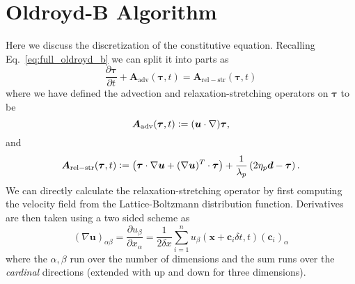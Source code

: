 \section{Oldroyd-B Algorithm}
Here we discuss the discretization of the constitutive equation. Recalling Eq.~\eqref{eq:full_oldroyd_b} we can split it into parts as
\begin{equation}\label{eq:oldroyd_b_operators}
\frac{\partial \bm{\tau}}{\partial t} + \bm{A}_{\mathrm{adv}}(\bm{\tau},t) =\bm{A}_{\mathrm{rel-str}}(\bm{\tau},t)
\end{equation}
where we have defined the advection and relaxation-stretching operators on $\bm{\tau}$ to be
\begin{equation}\label{eq:advection_operator}
\bm{A}_{\mathrm{adv}}(\bm{\tau},t) \vcentcolon= (\bm{u} \cdot \nabla)\bm{\tau},
\end{equation}
and
\begin{equation}\label{eq:relaxation_stretching_operator}
\bm{A}_{\mathrm{rel-str}}(\bm{\tau},t) \vcentcolon= \left(\bm{\tau} \cdot \nabla\bm{u} +(\nabla\bm{u})^T \cdot \bm{\tau}\right) + \frac{1}{\lambda_p}\left(2\eta_p \bm{d} - \bm{\tau}\right).
\end{equation}
We can directly calculate the relaxation-stretching operator by first computing the velocity field from the Lattice-Boltzmann distribution function. Derivatives are then taken using a two sided scheme as
\begin{equation}\label{eq:velocity_gradient_scheme}
(\nabla \bm{u})_{\alpha \beta} = \frac{\partial u_\beta}{\partial x_\alpha} = \frac{1}{2\delta x} \sum_{i=1}^{n}u_\beta(\bm{x} + \bm{c}_i\delta t, t)(\bm{c}_i)_\alpha
\end{equation}
where the $\alpha,\beta$ run over the number of dimensions and the sum runs over the \textit{cardinal} directions (extended with up and down for three dimensions).

